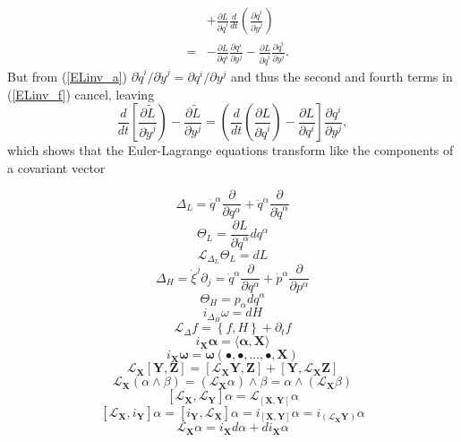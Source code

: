 \documentclass[10pt]{article}
\begin{document}
\begin{textblock*}{65mm}
\begin{eqnarray}
	&   & + \frac{\partial L}{\partial {\dot q}^i} \frac{d}{dt} \left( \frac{\partial {\dot q}^i}{\partial {\dot y}^j} \right) \\ \nonumber
    & = & - \frac{\partial L}{\partial q^i}        \frac{\partial q^i}{\partial y^j} 
	      - \frac{\partial L}{\partial {\dot q}^i} \frac{\partial {\dot q}^i}{\partial y^j} .\nonumber
\end{eqnarray}
But from (\ref{ELinv_a}) $ {\partial {\dot q}^i}/{\partial {\dot y}^j} = {\partial q^i}/{\partial y^j}$ and thus the second and
fourth terms in (\ref{ELinv_f}) cancel, leaving
\begin{equation}\label{ELinv_g}
  \frac{d}{dt} \left[ \frac{\partial \tilde L}{\partial {\dot y}^j } \right) - \frac{\partial \tilde L}{\partial y^j} = 
  \left( \frac{d}{d t} \left( \frac{\partial L}{\partial {\dot q}^i} \right) - \frac{\partial L}{\partial q^i} \right] 
  \frac{\partial q^i}{\partial y^j} ,
\end{equation}
which shows that the Euler-Lagrange equations transform like the components of a covariant vector
\end{textblock*}

\[
  \Delta_L = {\dot q}^{\alpha} \frac{\partial}{\partial q^{\alpha}} + {\ddot q}^{\alpha} \frac{\partial}{\partial {\dot q}^{\alpha}}
\]
\[
  \Theta_L = \frac{\partial L}{\partial {\dot q}^{\alpha}} d q^{\alpha}
\]
\[
  {\mathcal L}_{\Delta_L} \Theta_L = d L
\]
\[
  \Delta_H = {\dot \xi}^{j} \partial_j = {\dot q}^{\alpha} \frac{\partial}{\partial {q^{\alpha}}} + {\dot p}^{\alpha} \frac{\partial}{\partial {p^{\alpha}}}
\]
\[
  \Theta_H = p_{\alpha} d q^{\alpha}
\]
\[
  i_{\Delta_H} \omega = d H
\]
\[
 {\mathcal L}_{\Delta} f = \left\{ f , H \right\} + \partial_t f
\]
\[
  i_{\mathbf X} {\mathbf \alpha} = \langle {\mathbf \alpha} , {\mathbf X} \rangle
\]
\[
  i_{\mathbf X} {\mathbf \omega} = {\mathbf \omega} \left( \bullet , \bullet, \dots, \bullet, {\mathbf X} \right)
\]
\[
   {\mathcal L}_{\mathbf X} \left[ {\mathbf Y}, {\mathbf Z} \right] 
 = \left[ {\mathcal L}_{\mathbf X} {\mathbf Y}, {\mathbf Z} \right] + \left[ {\mathbf Y}, {\mathcal L}_{\mathbf X} {\mathbf Z} \right]
\]
\[
  {\mathcal L}_{\mathbf X} \left( \alpha \wedge \beta \right) 
 = \left( {\mathcal L}_{\mathbf X} \alpha \right) \wedge \beta
 = \alpha \wedge \left( {\mathcal L}_{\mathbf X} \beta \right) 
\]
\[
  \left[ {\mathcal L}_{\mathbf X}, {\mathcal L}_{\mathbf Y} \right] \alpha = {\mathcal L}_{\left[ {\mathbf X}, {\mathbf Y} \right] } \alpha
\]
\[
    \left[ {\mathcal L}_{\mathbf X} , i_{\mathbf Y} \right] \alpha 
  = \left[ i_{\mathbf Y}, {\mathcal L}_{\mathbf X} \right] \alpha 
  = i_{\left[ {\mathbf X}, {\mathbf Y} \right] } \alpha
  = i_{ \left( {\mathcal L}_{\mathbf X} {\mathbf Y} \right) } \alpha
\]
\[
 {\mathcal L}_{\mathbf X} \alpha = i_{\mathbf X} d \alpha + d i_{\mathbf X} \alpha
\]
\end{document}
